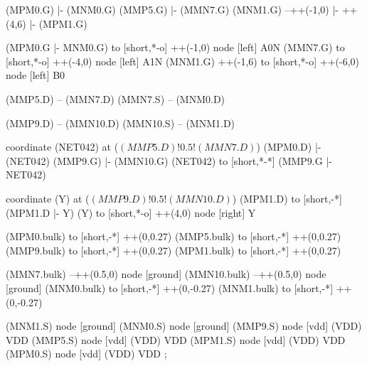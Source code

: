 \begin{circuitikz}[american]
	(MPM0.G) |- (MNM0.G)
	(MMP5.G) |- (MMN7.G)
	(MNM1.G) --++(-1,0) |- ++(4,6) |- (MPM1.G) 
	
	(MPM0.G |- MNM0.G) to [short,*-o] ++(-1,0) node [left] {A0N} 
	(MMN7.G) to [short,*-o] ++(-4,0) node [left] {A1N}
	(MNM1.G) ++(-1,6) to [short,*-o] ++(-6,0) node [left] {B0}
	
	(MMP5.D) -- (MMN7.D)
	(MMN7.S) -- (MNM0.D)
	
	(MMP9.D) -- (MMN10.D)
	(MMN10.S) -- (MNM1.D)
	
	coordinate (NET042) at ($(MMP5.D)!0.5!(MMN7.D)$)
	(MPM0.D) |- (NET042) 
	(MMP9.G) |- (MMN10.G)
	(NET042) to [short,*-*] (MMP9.G |- NET042)
	
	coordinate (Y) at ($(MMP9.D)!0.5!(MMN10.D)$)
	(MPM1.D) to [short,-*] (MPM1.D |- Y)
	(Y) to [short,*-o] ++(4,0) node [right] {Y}
	
	(MPM0.bulk) to [short,-*] ++(0,0.27)
	(MMP5.bulk) to [short,-*] ++(0,0.27)
	(MMP9.bulk) to [short,-*] ++(0,0.27)
	(MPM1.bulk) to [short,-*] ++(0,0.27)
	
	(MMN7.bulk) --++(0.5,0) node [ground]{}
	(MMN10.bulk) --++(0.5,0) node [ground]{}
	(MNM0.bulk) to [short,-*] ++(0,-0.27)	
	(MNM1.bulk) to [short,-*] ++(0,-0.27)


	(MNM1.S) node [ground] {}
	(MNM0.S) node [ground] {}
	(MMP9.S) node [vdd] (VDD) {VDD}
	(MMP5.S) node [vdd] (VDD) {VDD}
	(MPM1.S) node [vdd] (VDD) {VDD}
	(MPM0.S) node [vdd] (VDD) {VDD}
;

\end{circuitikz}
